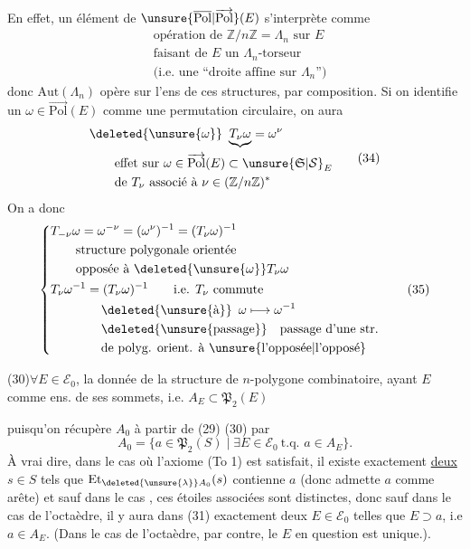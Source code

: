 En effet, un élément de $\unsure{\overline{\mathrm{Pol}}|\overrightarrow{\mathrm{Pol}}}(E)$ s'interprète comme
\[
\begin{aligned}
&\text{opération de }\mathbb Z/n\mathbb Z=\Lambda_n\text{ sur }E\\
&\text{faisant de }E\text{ un }\Lambda_n\text{-torseur}\\
&\text{(i.e. une ``droite affine sur }\Lambda_n\text{'')}
\end{aligned}
\]
donc $\mathrm{Aut}(\Lambda_n)$ opère sur l'ens de ces structures, par composition. Si on identifie un $\omega\in\overrightarrow{\mathrm{Pol}}(E)$ comme une permutation circulaire, on aura
\[
\begin{aligned}
&\deleted{\unsure{\omega}}\ \underbrace{T_{\nu}\omega}=\omega^\nu\\
&\qquad\text{effet sur }\omega\in\overrightarrow{\mathrm{Pol}}(E)\subset\unsure{\mathfrak S|\mathcal S}_E\\
&\qquad\text{de }T_\nu\text{ associé à }\nu\in(\mathbb Z/n\mathbb Z)^*
\end{aligned}\tag*{(34)}
\]
On a donc
\[
\left\{\begin{aligned}
&T_{-\nu}\omega=\omega^{-\nu}=(\omega^\nu)^{-1}=(T_\nu\omega)^{-1}\\
&\qquad\text{structure polygonale orientée}\\
&\qquad\text{opposée à }\deleted{\unsure{\omega}}T_\nu\omega\\
&T_\nu\omega^{-1}=(T_\nu\omega)^{-1}\qquad\text{i.e. }T_\nu\text{ commute}\\
&\qquad\qquad\deleted{\unsure{\text{à}}}\enspace\omega\longmapsto\omega^{-1}\\
&\qquad\qquad\deleted{\text{\unsure{passage}}}\quad\text{passage d'une str.}\\
&\qquad\qquad\text{de polyg. orient. à \unsure{l'opposée|l'opposé}}
\end{aligned}\right.\tag*{(35)}
\]


(30)\qquad $\forall E\in\mathcal E_0$, la donnée de la structure de $n$-polygone combinatoire, ayant $E$ comme ens. de ses sommets, i.e.  $A_E\subset\mathfrak P_2(E)$

puisqu'on récupère $A_0$ à partir de (29) (30) par
\[
A_0=\{a\in\mathfrak P_2(S)\mid\exists E\in\mathcal E_0\ \text{t.q. }a\in A_E\}.\tag*{(31)}
\]
À vrai dire,  dans le cas où l'axiome (To 1) est satisfait, il existe exactement \uline{deux} $s\in S$ tels que $\mathrm{Et}_{\deleted{\unsure{\lambda}}A_0}(s)$ contienne $a$ (donc admette $a$ comme arête) et sauf dans le cas , ces étoiles associées sont distinctes, donc sauf dans le cas de l'octaèdre, il y aura dans (31) exactement deux $E\in\mathcal E_0$ telles que $E\supset a$, i.e $a\in A_E$. (Dans le cas de l'octaèdre, par contre, le $E$ en question est unique.).

